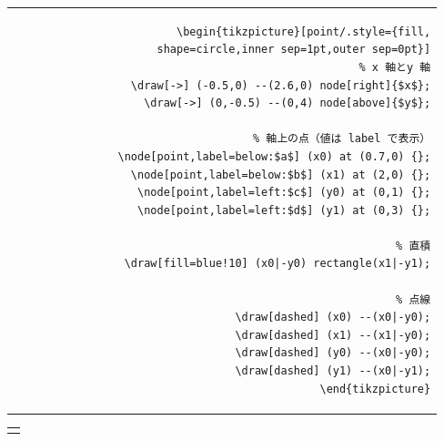 \documentclass[lualatex]{jlreq}
\begin{document}
\begin{minipage}{0.64 \textwidth}
    \begin{flushright}
        \begin{tabular}{r}
            \begin{lstlisting}[language={[LaTeX] TeX},
            numbers=none,breaklines=true,gobble=12,frame=none]
            \begin{tikzpicture}[point/.style={fill,
                shape=circle,inner sep=1pt,outer sep=0pt}]
                % x 軸とy 軸
                \draw[->] (-0.5,0) --(2.6,0) node[right]{$x$};
                \draw[->] (0,-0.5) --(0,4) node[above]{$y$};

                % 軸上の点（値は label で表示）
                \node[point,label=below:$a$] (x0) at (0.7,0) {};
                \node[point,label=below:$b$] (x1) at (2,0) {};
                \node[point,label=left:$c$] (y0) at (0,1) {};
                \node[point,label=left:$d$] (y1) at (0,3) {};

                % 直積
                \draw[fill=blue!10] (x0|-y0) rectangle(x1|-y1);

                % 点線
                \draw[dashed] (x0) --(x0|-y0);
                \draw[dashed] (x1) --(x1|-y0);
                \draw[dashed] (y0) --(x0|-y0);
                \draw[dashed] (y1) --(x0|-y1);
            \end{tikzpicture}
            \end{lstlisting}
        \end{tabular}
    \end{flushright}
\end{minipage}
\hfill
\begin{minipage}{0.34 \textwidth}
    \begin{flushleft}
        \begin{tabular}{l}
            \begin{tikzpicture}[point/.style={fill,
                            shape=circle,inner sep=1pt,outer sep=0pt}]
                \draw[->] (-0.5,0) --(2.6,0) node[right]{$x$};
                \draw[->] (0,-0.5) --(0,4) node[above]{$y$};

                \node[point,label=below:$a$] (x0) at (0.7,0) {};
                \node[point,label=below:$b$] (x1) at (2,0) {};
                \node[point,label=left:$c$] (y0) at (0,1) {};
                \node[point,label=left:$d$] (y1) at (0,3) {};

                \draw[fill=blue!10] (x0|-y0) rectangle(x1|-y1);

                \draw[dashed] (x0) --(x0|-y0);
                \draw[dashed] (x1) --(x1|-y0);
                \draw[dashed] (y0) --(x0|-y0);
                \draw[dashed] (y1) --(x0|-y1);
            \end{tikzpicture}
        \end{tabular}
    \end{flushleft}
\end{minipage}
\\[1em]
\end{document}
